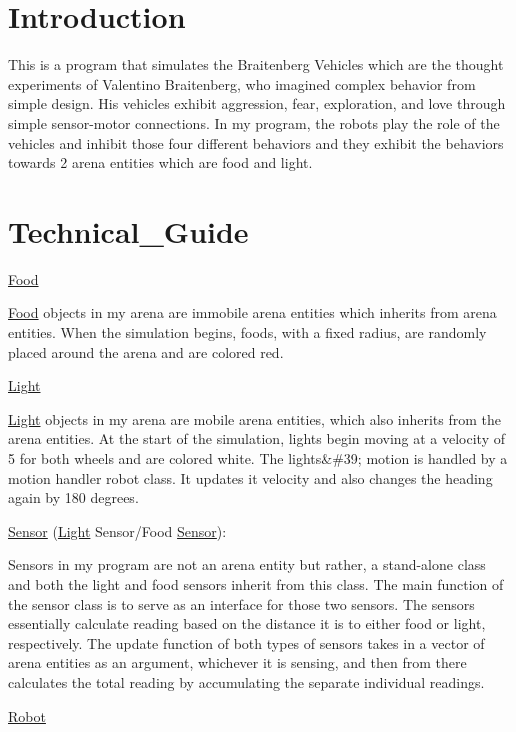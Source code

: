 \hypertarget{index_intro_sec}{}\section{Introduction}\label{index_intro_sec}
This is a program that simulates the Braitenberg Vehicles which are the thought experiments of Valentino Braitenberg, who imagined complex behavior from simple design. His vehicles exhibit aggression, fear, exploration, and love through simple sensor-\/motor connections. In my program, the robots play the role of the vehicles and inhibit those four different behaviors and they exhibit the behaviors towards 2 arena entities which are food and light. \hypertarget{index_Technical_Guide}{}\section{Technical\+\_\+\+Guide}\label{index_Technical_Guide}
\mbox{\hyperlink{class_food}{Food}}

\mbox{\hyperlink{class_food}{Food}} objects in my arena are immobile arena entities which inherits from arena entities. When the simulation begins, foods, with a fixed radius, are randomly placed around the arena and are colored red.

\mbox{\hyperlink{class_light}{Light}}

\mbox{\hyperlink{class_light}{Light}} objects in my arena are mobile arena entities, which also inherits from the arena entities. At the start of the simulation, lights begin moving at a velocity of 5 for both wheels and are colored white. The lights\&\#39; motion is handled by a motion handler robot class. It updates it velocity and also changes the heading again by 180 degrees.

\mbox{\hyperlink{class_sensor}{Sensor}} (\mbox{\hyperlink{class_light}{Light}} Sensor/\+Food \mbox{\hyperlink{class_sensor}{Sensor}})\+:

Sensors in my program are not an arena entity but rather, a stand-\/alone class and both the light and food sensors inherit from this class. The main function of the sensor class is to serve as an interface for those two sensors. The sensors essentially calculate reading based on the distance it is to either food or light, respectively. The update function of both types of sensors takes in a vector of arena entities as an argument, whichever it is sensing, and then from there calculates the total reading by accumulating the separate individual readings.

\mbox{\hyperlink{class_robot}{Robot}}

